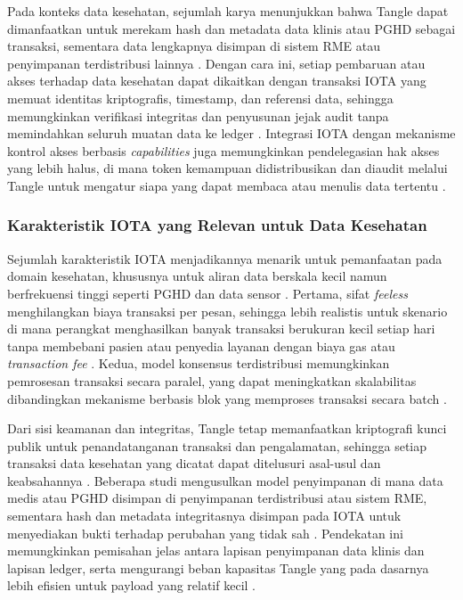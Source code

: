 Pada konteks data kesehatan, sejumlah karya menunjukkan bahwa Tangle dapat dimanfaatkan untuk merekam hash dan metadata data klinis atau PGHD sebagai transaksi, sementara data lengkapnya disimpan di sistem RME atau penyimpanan terdistribusi lainnya \parencite{Elevating_2025_iota_ehealth,Exploring_IOTA_HealthData_2022}. 
Dengan cara ini, setiap pembaruan atau akses terhadap data kesehatan dapat dikaitkan dengan transaksi IOTA yang memuat identitas kriptografis, timestamp, dan referensi data, sehingga memungkinkan verifikasi integritas dan penyusunan jejak audit tanpa memindahkan seluruh muatan data ke ledger \parencite{Elevating_2025_iota_ehealth,Exploring_IOTA_HealthData_2022}. 
Integrasi IOTA dengan mekanisme kontrol akses berbasis \emph{capabilities} juga memungkinkan pendelegasian hak akses yang lebih halus, di mana token kemampuan didistribusikan dan diaudit melalui Tangle untuk mengatur siapa yang dapat membaca atau menulis data tertentu \parencite{IOTA_AccessControl_2022}. 

\subsubsection{Karakteristik IOTA yang Relevan untuk Data Kesehatan}

Sejumlah karakteristik IOTA menjadikannya menarik untuk pemanfaatan pada domain kesehatan, khususnya untuk aliran data berskala kecil namun berfrekuensi tinggi seperti PGHD dan data sensor \parencite{Elevating_2025_iota_ehealth}. 
Pertama, sifat \emph{feeless} menghilangkan biaya transaksi per pesan, sehingga lebih realistis untuk skenario di mana perangkat menghasilkan banyak transaksi berukuran kecil setiap hari tanpa membebani pasien atau penyedia layanan dengan biaya gas atau \emph{transaction fee} \parencite{Elevating_2025_iota_ehealth}. 
Kedua, model konsensus terdistribusi memungkinkan pemrosesan transaksi secara paralel, yang dapat meningkatkan skalabilitas dibandingkan mekanisme berbasis blok yang memproses transaksi secara batch \parencite{FromTangleToRebased_2024}. 

Dari sisi keamanan dan integritas, Tangle tetap memanfaatkan kriptografi kunci publik untuk penandatanganan transaksi dan pengalamatan, sehingga setiap transaksi data kesehatan yang dicatat dapat ditelusuri asal-usul dan keabsahannya \parencite{Elevating_2025_iota_ehealth}. 
Beberapa studi mengusulkan model penyimpanan di mana data medis atau PGHD disimpan di penyimpanan terdistribusi atau sistem RME, sementara hash dan metadata integritasnya disimpan pada IOTA untuk menyediakan bukti terhadap perubahan yang tidak sah \parencite{Elevating_2025_iota_ehealth}. 
Pendekatan ini memungkinkan pemisahan jelas antara lapisan penyimpanan data klinis dan lapisan ledger, serta mengurangi beban kapasitas Tangle yang pada dasarnya lebih efisien untuk payload yang relatif kecil \parencite{Elevating_2025_iota_ehealth,FromTangleToRebased_2024}. 

